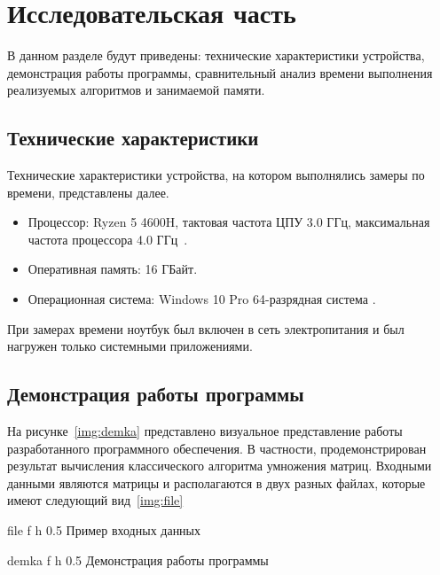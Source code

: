 \chapter{Исследовательская часть}

В данном разделе будут приведены: технические характеристики устройства, демонстрация работы программы, сравнительный анализ времени выполнения реализуемых алгоритмов и занимаемой памяти.

\section{Технические характеристики}

Технические характеристики устройства, на котором выполнялись замеры по времени, представлены далее.

\begin{itemize}
	\item Процессор: Ryzen 5 4600H, тактовая частота ЦПУ 3.0 ГГц, максимальная частота процессора 4.0 ГГц~\cite{ryzen}.
	\item Оперативная память: 16 ГБайт.
	\item Операционная система: Windows 10 Pro 64-разрядная система \cite{windows}.
\end{itemize}

При замерах времени ноутбук был включен в сеть электропитания и был нагружен только системными приложениями.

\section{Демонстрация работы программы}

На рисунке~\ref{img:demka} представлено визуальное представление работы разработанного программного обеспечения. В частности, продемонстрирован результат вычисления классического алгоритма умножения матриц.
Входными данными являются матрицы и располагаются в двух разных файлах, которые имеют следующий вид~\ref{img:file}

	{file} %
	{f} %
	{h} %
	{0.5\textwidth} %
	{Пример входных данных} %
	

	{demka} %
	{f} %
	{h} %
	{0.5\textwidth} %
	{Демонстрация работы программы} %


